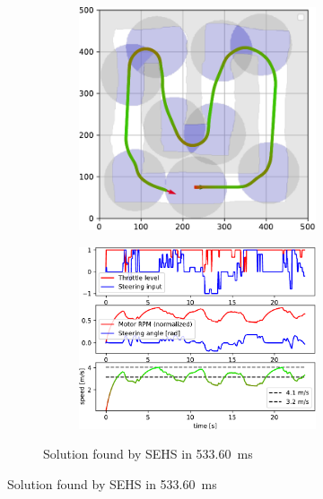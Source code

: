 \begin{figure}[!tbp]
	\vspace{0.75cm}
	
	\begin{subfigure}[t]{\textwidth}
		\begin{subfigure}[c]{0.49\textwidth}
			\includegraphics[width=\textwidth]{../img/experiments/u_sehs_trajectory}
		\end{subfigure}
		\hfill
		\begin{subfigure}[c]{0.49\textwidth}
			\includegraphics[width=\textwidth]{../img/experiments/u_sehs_actuators}
		\end{subfigure}
		\caption{Solution found by SEHS in \SI{533.60}{\milli\second}}
		\label{fig:u-sehs}
	\end{subfigure}
	

\end{figure}
